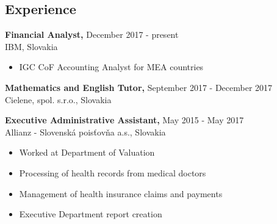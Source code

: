 \documentclass[margin]{res}
\begin{document}

\address{{\bf Permanent Address} \\ Dobrianskeho 1597/49 \\ 093 01 Vranov nad Top\v{l}ou \\ Slovakia \\
        +421 908 274 464 \\ zuzana@kosalko.sk \\ linkedin.com/in/zuzana-kosalkova}

\address{}


\begin{resume}


\section{Experience}

{\bf Financial Analyst,} \hfill December 2017 - present \\
IBM, Slovakia
\begin{itemize} \itemsep -2pt %
\item IGC CoF Accounting Analyst for MEA countries
\end{itemize}

{\bf Mathematics and English Tutor,} \hfill September 2017 - December 2017 \\
Cielene, spol. s.r.o., Slovakia

{\bf Executive Administrative Assistant,} \hfill May 2015 - May 2017 \\
Allianz - Slovensk\'{a} pois\v{t}ov\v{n}a a.s., Slovakia
\begin{itemize} \itemsep -2pt %
\item Worked at Department of Valuation
\item Processing of health records from medical doctors
\item Management of health insurance claims and payments
\item Executive Department report creation
\end{itemize}


\end{resume}
\end{document}
